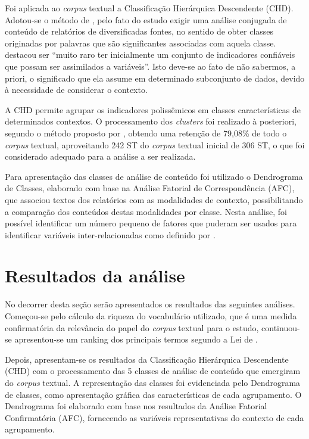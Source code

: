 \documentclass{textolivre-html}
\begin{document}
Foi aplicada ao \textit{corpus} textual a Classificação Hierárquica Descendente (CHD). Adotou-se o método de \textcite{reinert1990}, pelo fato do estudo exigir uma análise conjugada de conteúdo de relatórios de diversificadas fontes, no sentido de obter classes originadas por palavras que são significantes associadas com aquela classe. \textcite[p. 187]{reinert1983} destacou ser “muito raro ter inicialmente um conjunto de indicadores confiáveis que possam ser assimilados a variáveis”. Isto deve-se ao fato de não sabermos, a priori, o significado que ela assume em determinado subconjunto de dados, devido à necessidade de considerar o contexto.

A CHD permite agrupar os indicadores polissêmicos em classes características de determinados contextos. O processamento dos \textit{clusters} foi realizado à posteriori, segundo o método proposto por \textcite{reinert1990}, obtendo uma retenção de 79,08\% de todo o \textit{corpus} textual, aproveitando 242 ST do \textit{corpus} textual inicial de 306 ST, o que foi considerado adequado para a análise a ser realizada.

Para apresentação das classes de análise de conteúdo foi utilizado o Dendrograma de Classes, elaborado com base na Análise Fatorial de Correspondência (AFC), que associou textos dos relatórios com as modalidades de contexto, possibilitando a comparação dos conteúdos destas modalidades por classe. Nesta análise, foi possível identificar um número pequeno de fatores que puderam ser usados para identificar variáveis inter-relacionadas como definido por \textcite{lebart1994}.

\section{Resultados da análise}\label{sec-resultados}
No decorrer desta seção serão apresentados os resultados das seguintes análises. Começou-se pelo cálculo da riqueza do vocabulário utilizado, que é uma medida confirmatória da relevância do papel do \textit{corpus} textual para o estudo, continuou-se apresentou-se um ranking dos principais termos segundo a Lei de \textcite{zipf1949}.

Depois, apresentam-se os resultados da Classificação Hierárquica Descendente (CHD) com o processamento das 5 classes de análise de conteúdo que emergiram do \textit{corpus} textual. A representação das classes foi evidenciada pelo Dendrograma de classes, como apresentação gráfica das características de cada agrupamento. O Dendrograma foi elaborado com base nos resultados da Análise Fatorial Confirmatória (AFC), fornecendo as variáveis representativas do contexto de cada agrupamento.
\end{document}
